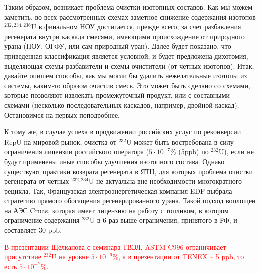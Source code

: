 Таким образом, возникает проблема очистки изотопных составов.
Как мы можем заметить, во всех рассмотренных схемах заметное снижение содержания изотопов $^{232,234,236}$U в финальном НОУ достигается, прежде всего, за счет разбавления регенерата внутри каскада смесями, имеющими происхождение от природного урана (НОУ, ОГФУ, или сам природный уран). Далее будет показано, что приведенная классификация является условной, и будет предложена дихотомия, выделяющая схемы-разбавители и схемы-очистители (от четных изотопов). Итак, давайте опишем способы, как мы могли бы удалить нежелательные изотопы из системы, каким-то образом очистив смесь. Это может быть сделано со схемами, которые позволяют извлекать промежуточный продукт, или с составными схемами (несколько последовательных каскадов, например, двойной каскад). Остановимся на первых поподробнее.

К тому же, в случае успеха в продвижении российских услуг по реконверсии RepU на мировой рынок, очистка от $^{232}$U может быть востребована в силу ограничения лицензии российского оператора ($5\cdot10^{-7}$\% (5ppb) по $^{232}$U), если не будут применены иные способы улучшения изотопного состава.
Однако существуют практики возврата регенерата в ЯТЦ, для которых проблема очистки регенерата от четных $^{232,234}$U не актуальна вне необходимости многократного рецикла. Так, Французская электроэнергетическая компания EDF выбрала стратегию прямого обогащения регенерированного урана. Такой подход воплощен на АЭС Cruas, которая имеет лицензию на работу с топливом, в котором ограничение содержания $^{232}$U в 6 раз выше ограничения, принятого в РФ, и составляет 30 ppb.

\textcolor{red}{В презентации Щелканова с семинара ТВЭЛ, ASTM C996 ограничивает присутствие $^{232}$U на уровне $5\cdot10^{-6}$\%, а в презентации от TENEX -- 5 ppb, то есть $5\cdot10^{-7}$\%.}



